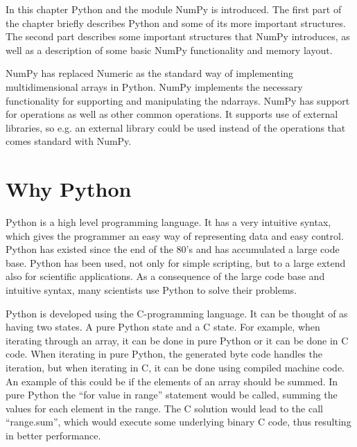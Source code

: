 In this chapter Python and the module NumPy is introduced. The first
part of the chapter briefly describes Python and some of its more
important structures. The second part describes some important
structures that NumPy introduces, as well as a description of some
basic NumPy functionality and memory layout.

NumPy has replaced Numeric as the standard way of implementing
multidimensional arrays in Python. NumPy implements the necessary
functionality for supporting and manipulating the ndarrays. NumPy has
support for \BLAS{} operations as well as other common operations. It
supports use of external libraries, so e.g. an external \BLAS{}
library could be used instead of the \BLAS{} operations that comes
standard with NumPy.




\section{Why Python}

Python is a high level programming language. It has a very intuitive
syntax, which gives the programmer an easy way of representing data
and easy control. Python has existed since the end of the 80's and has
accumulated a large code base. Python has been used, not only for
simple scripting, but to a large extend also for scientific
applications. As a consequence of the large code base and intuitive
syntax, many scientists use Python to solve their problems.

Python is developed using the C-programming language. It can be
thought of as having two states. A pure Python state and a C
state. For example, when iterating through an array, it can be done in
pure Python or it can be done in C code. When iterating in pure
Python, the generated byte code handles the iteration, but when
iterating in C, it can be done using compiled machine code. An example
of this could be if the elements of an array should be summed. In pure
Python the ``for value in range'' statement would be called, summing
the values for each element in the range. The C solution would lead to
the call ``range.sum'', which would execute some underlying binary C
code, thus resulting in better performance.

